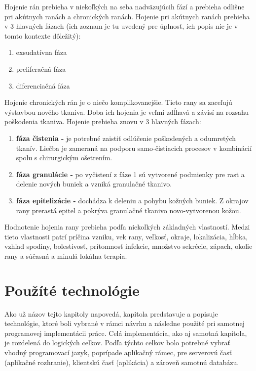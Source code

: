 Hojenie rán prebieha v niekoľkých na seba nadväzujúcih fází a prebieha odlišne pri akútnych ranách a chronických ranách. Hojenie pri akútnych ranách prebieha v 3 hlavných fázach (ich zoznam je tu uvedený pre úplnosť, ich popis nie je v tomto kontexte dôležitý):
\begin{enumerate}
\item exsudatívna fáza
\item preliferačná fáza
\item diferenciačná fáza
\end{enumerate}
Hojenie chronických rán je o niečo komplikovanejšie. Tieto rany sa zaceľujú výstavbou nového tkaniva. Doba ich hojenia je veľmi zdĺhavá a závisí na rozsahu poškodenia tkaniva. Hojenie prebieha znovu v 3 hlavných fázach:
\begin{enumerate}
\item \textbf{fáza čistenia -} je potrebné zaistiť odlúčenie poškodených a odumretých tkanív. Liečba je zameraná na podporu samo-čistiacich procesov v kombinácií spolu s chirurgickým ošetrením.
\item \textbf{fáza granulácie -} po vyčistení z fáze 1 sú vytvorené podmienky pre rast a delenie nových buniek a vzniká granulačné tkanivo.
\item \textbf{fáza epitelizácie -} dochádza k deleniu a pohybu kožných buniek. Z okrajov rany prerastá epitel a pokrýva granulačné tkanivo novo-vytvorenou kožou.
\end{enumerate}

Hodnotenie hojenia rany prebieha podľa niekoľkých základných vlastností. Medzi tieto vlastnosti patrí príčina vzniku, vek rany, veľkosť, okraje, lokalizácia, hĺbka, vzhľad spodiny, bolestivosť, prítomnosť infekcie, množstvo sekrécie, zápach, okolie rany a súčasná a minulá lokálna terapia.


\chapter{Použíté technológie}
Ako už názov tejto kapitoly napovedá, kapitola predstavuje a popisuje technológie, ktoré boli vybrané v rámci návrhu a následne použité pri samotnej programovej implementácii práce. Celá implementácia, ako aj samotná kapitola, je rozdelená do logických celkov. Podľa týchto celkov bolo potrebné vybrať vhodný programovací jazyk, poprípade aplikačný rámec, pre serverovú časť (aplikačné rozhranie), klientskú časť (aplikácia) a zároveň samotnú databázu.

